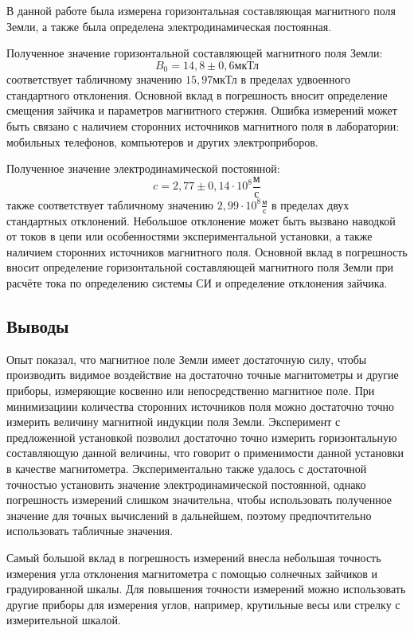 \documentclass[a4paper,12pt]{article} %
\begin{document}
В данной работе была измерена горизонтальная составляющая магнитного поля Земли, а также была определена электродинамическая постоянная.

Полученное значение горизонтальной составляющей магнитного поля Земли:
$$\boxed{B_0 = 14,8\pm0,6 \text{мкТл}}$$ соответствует табличному значению $15,97 \text{мкТл}$ в пределах удвоенного стандартного отклонения. Основной вклад в погрешность вносит определение смещения зайчика и параметров магнитного стержня. Ошибка измерений может быть связано с наличием сторонних источников магнитного поля в лаборатории: мобильных телефонов, компьютеров и других электроприборов.

Полученное значение электродинамической постоянной: $$\boxed{c = 2,77\pm0,14\cdot10^8 \frac{\text{м}}{\text{с}}}$$ также соответствует табличному значению $2,99\cdot10^8 \frac{\text{м}}{\text{с}}$ в пределах двух стандартных отклонений. Небольшое отклонение может быть вызвано наводкой от токов в цепи или особенностями экспериментальной установки, а также наличием сторонних источников магнитного поля. Основной вклад в погрешность вносит определение горизонтальной составляющей магнитного поля Земли при расчёте тока по определению системы СИ и определение отклонения зайчика.

\subsection*{Выводы}

Опыт показал, что магнитное поле Земли имеет достаточную силу, чтобы производить видимое воздействие на достаточно точные магнитометры и другие приборы, измеряющие косвенно или непосредственно магнитное поле. При минимизациии количества сторонних источников поля можно достаточно точно измерить величину магнитной индукции поля Земли. Эксперимент с предложенной установкой позволил достаточно точно измерить горизонтальную составляющую данной величины, что говорит о применимости данной установки в качестве магнитометра. Экспериментально также удалось с достаточной точностью установить значение электродинамической постоянной, однако погрешность измерений слишком значительна, чтобы использовать полученное значение для точных вычислений в дальнейшем, поэтому предпочтительно использовать табличные значения.

Самый большой вклад в погрешность измерений внесла небольшая точность измерения угла отклонения магнитометра с помощью солнечных зайчиков и градуированной шкалы. Для повышения точности измерений можно использовать другие приборы для измерения углов, например, крутильные весы или стрелку с измерительной шкалой.
\end{document}
